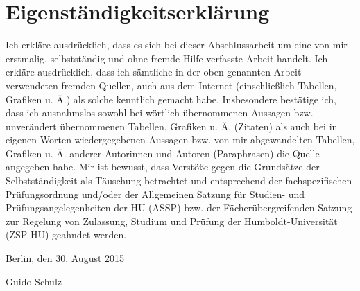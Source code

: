 
\section*{Eigenständigkeitserklärung}

Ich erkläre ausdrücklich, dass es sich bei dieser Abschlussarbeit um eine von mir erstmalig, selbstständig und ohne fremde Hilfe verfasste Arbeit handelt. Ich erkläre ausdrücklich, dass ich sämtliche in der oben genannten Arbeit
verwendeten fremden Quellen, auch aus dem Internet (einschließlich Tabellen,
Grafiken u. Ä.) als solche kenntlich gemacht habe. Insbesondere bestätige ich,
dass ich ausnahmslos sowohl bei wörtlich übernommenen Aussagen bzw.
unverändert übernommenen Tabellen, Grafiken u. Ä. (Zitaten) als auch bei in
eigenen Worten wiedergegebenen Aussagen bzw. von mir abgewandelten
Tabellen, Grafiken u. Ä. anderer Autorinnen und Autoren (Paraphrasen) die
Quelle angegeben habe. Mir ist bewusst, dass Verstöße gegen die Grundsätze der Selbstständigkeit als
Täuschung betrachtet und entsprechend der fachspezifischen Prüfungsordnung
und/oder der Allgemeinen Satzung für Studien- und Prüfungsangelegenheiten
der HU (ASSP) bzw. der Fächerübergreifenden Satzung zur Regelung von
Zulassung, Studium und Prüfung der Humboldt-Universität (ZSP-HU) geahndet
werden.

\vspace{1cm}

Berlin, den 30. August 2015 \vspace{1.5cm}

Guido Schulz
